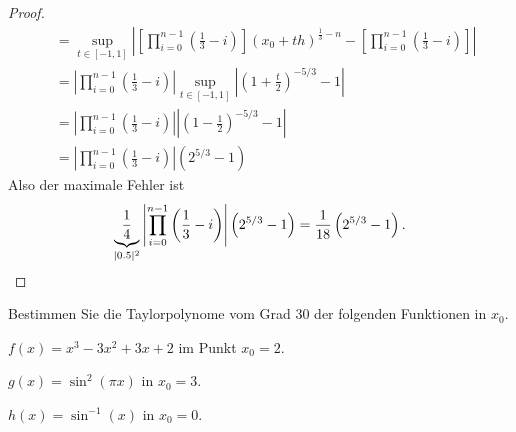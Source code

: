 \begin{proof}
\begin{align*}
	&= \sup_{t\in [-1,1]}\left| \left[\prod_{i=0}^{n-1}\left( \frac{1}{3}-i \right) \right] \left( x_0+th \right) ^{\frac{1}{3}-n}-\left[ \prod_{i=0}^{n-1}\left( \frac{1}{3}-i \right)    \right]    \right|\\
	&= \left| \prod_{i=0}^{n-1}\left( \frac{1}{3}-i \right) \right|\sup_{t\in[-1,1]}\left| \left(1+\frac{t}{2}\right)^{- 5 / 3}-1 \right| \\
	&=\left| \prod_{i=0}^{n-1} \left( \frac{1}{3}-i \right)  \right|\left| \left( 1-\frac{1}{2} \right)^{- 5 / 3}-1 \right|\\
	&=\left| \prod_{i=0}^{n-1}\left( \frac{1}{3}-i \right) \right| \left( 2^{5 / 3}-1 \right)  
\end{align*}
Also der maximale Fehler ist
\[
	\underbrace{\frac{1}{4}}_{|0.5|^2}\left| \prod_{i=0}^{n-1} \left( \frac{1}{3}-i \right)   \right| \left( 2^{5 / 3}-1 \right)=\frac{1}{18}\left( 2^{5 / 3}-1 \right)  
.\qedhere\]
\end{proof}
\begin{Problem}
	Bestimmen Sie die Taylorpolynome vom Grad 30 der folgenden Funktionen in $x_0$.
	\begin{parts}
	\item $f(x)=x^3-3x^2+3x+2$ im Punkt $x_0=2$.
	\item $g(x)=\sin^2\left( \pi x \right) $ in $x_0=3$.
	\item $h(x)=\sin^{-1}(x)$ in $x_0=0$.
	\end{parts}
\end{Problem}
